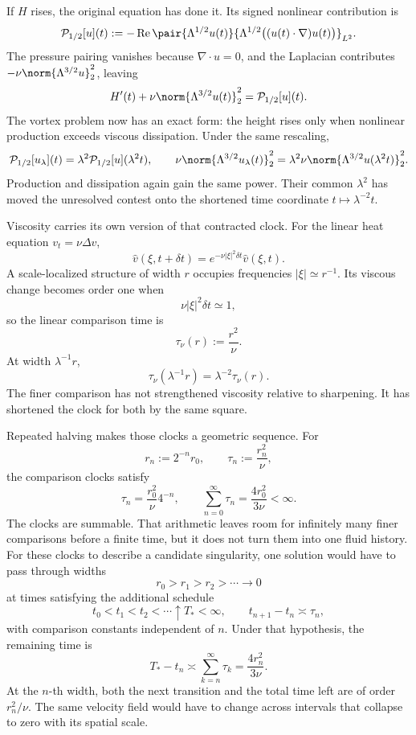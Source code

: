 If \(H\) rises, the original equation has done it.
Its signed nonlinear contribution is
\[
  \mathcal P_{1/2}[u](t)
  :=
  -\operatorname{Re}
  \pair
    {\Lambda^{1/2}u(t)}
    {\Lambda^{1/2}\bigl((u(t)\cdot\nabla)u(t)\bigr)}_{L^2}.
\]
The pressure pairing vanishes because \(\nabla\cdot u=0\), and the Laplacian contributes \(-\nu\norm{\Lambda^{3/2}u}_2^2\), leaving
\[
  H'(t)
  +
  \nu\norm{\Lambda^{3/2}u(t)}_2^2
  =
  \mathcal P_{1/2}[u](t).
\]
The vortex problem now has an exact form: the height rises only when nonlinear production exceeds viscous dissipation.
Under the same rescaling,
\[
  \mathcal P_{1/2}[u_\lambda](t)
  =
  \lambda^2\mathcal P_{1/2}[u](\lambda^2t),
  \qquad
  \nu\norm{\Lambda^{3/2}u_\lambda(t)}_2^2
  =
  \lambda^2\nu\norm{\Lambda^{3/2}u(\lambda^2t)}_2^2.
\]
Production and dissipation again gain the same power.
Their common \(\lambda^2\) has moved the unresolved contest onto the shortened time coordinate \(t\mapsto\lambda^{-2}t\).


Viscosity carries its own version of that contracted clock.
For the linear heat equation \(v_t=\nu\Delta v\),
\[
  \widehat v(\xi,t+\delta t)
  =
  e^{-\nu|\xi|^2\delta t}\widehat v(\xi,t).
\]
A scale-localized structure of width \(r\) occupies frequencies \(|\xi|\simeq r^{-1}\).
Its viscous change becomes order one when
\[
  \nu|\xi|^2\delta t\simeq1,
\]
so the linear comparison time is
\[
  \tau_\nu(r)
  :=
  \frac{r^2}{\nu}.
\]
At width \(\lambda^{-1}r\),
\[
  \tau_\nu(\lambda^{-1}r)
  =
  \lambda^{-2}\tau_\nu(r).
\]
The finer comparison has not strengthened viscosity relative to sharpening.
It has shortened the clock for both by the same square.


Repeated halving makes those clocks a geometric sequence.
For
\[
  r_n:=2^{-n}r_0,
  \qquad
  \tau_n:=\frac{r_n^2}{\nu},
\]
the comparison clocks satisfy
\[
  \tau_n
  =
  \frac{r_0^2}{\nu}4^{-n},
  \qquad
  \sum_{n=0}^{\infty}\tau_n
  =
  \frac{4r_0^2}{3\nu}
  <
  \infty.
\]
The clocks are summable.
That arithmetic leaves room for infinitely many finer comparisons before a finite time, but it does not turn them into one fluid history.
For these clocks to describe a candidate singularity, one \NavierStokes{} solution would have to pass through widths
\[
  r_0>r_1>r_2>\cdots\longrightarrow0
\]
at times satisfying the additional schedule
\[
  t_0<t_1<t_2<\cdots\uparrow T_*<\infty,
  \qquad
  t_{n+1}-t_n\asymp\tau_n,
\]
with comparison constants independent of \(n\).
Under that hypothesis, the remaining time is
\[
  T_*-t_n
  \asymp
  \sum_{k=n}^{\infty}\tau_k
  =
  \frac{4r_n^2}{3\nu}.
\]
At the \(n\)-th width, both the next transition and the total time left are of order \(r_n^2/\nu\).
The same velocity field would have to change across intervals that collapse to zero with its spatial scale.
